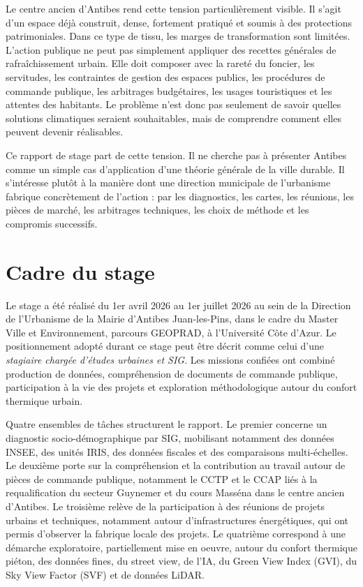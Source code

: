 \documentclass[11pt,a4paper]{report}
\begin{document}
Le centre ancien d'Antibes rend cette tension particulièrement visible. Il s'agit d'un espace déjà construit, dense, fortement pratiqué et soumis à des protections patrimoniales. Dans ce type de tissu, les marges de transformation sont limitées. L'action publique ne peut pas simplement appliquer des recettes générales de rafraîchissement urbain. Elle doit composer avec la rareté du foncier, les servitudes, les contraintes de gestion des espaces publics, les procédures de commande publique, les arbitrages budgétaires, les usages touristiques et les attentes des habitants. Le problème n'est donc pas seulement de savoir quelles solutions climatiques seraient souhaitables, mais de comprendre comment elles peuvent devenir réalisables.

Ce rapport de stage part de cette tension. Il ne cherche pas à présenter Antibes comme un simple cas d'application d'une théorie générale de la ville durable. Il s'intéresse plutôt à la manière dont une direction municipale de l'urbanisme fabrique concrètement de l'action : par les diagnostics, les cartes, les réunions, les pièces de marché, les arbitrages techniques, les choix de méthode et les compromis successifs.

\section*{Cadre du stage}

Le stage a été réalisé du 1er avril 2026 au 1er juillet 2026 au sein de la Direction de l'Urbanisme de la Mairie d'Antibes Juan-les-Pins, dans le cadre du Master Ville et Environnement, parcours GEOPRAD, à l'Université Côte d'Azur. Le positionnement adopté durant ce stage peut être décrit comme celui d'une \emph{stagiaire chargée d'études urbaines et SIG}. Les missions confiées ont combiné production de données, compréhension de documents de commande publique, participation à la vie des projets et exploration méthodologique autour du confort thermique urbain.

Quatre ensembles de tâches structurent le rapport. Le premier concerne un diagnostic socio-démographique par SIG, mobilisant notamment des données INSEE, des unités IRIS, des données fiscales et des comparaisons multi-échelles. Le deuxième porte sur la compréhension et la contribution au travail autour de pièces de commande publique, notamment le CCTP et le CCAP liés à la requalification du secteur Guynemer et du cours Masséna dans le centre ancien d'Antibes. Le troisième relève de la participation à des réunions de projets urbains et techniques, notamment autour d'infrastructures énergétiques, qui ont permis d'observer la fabrique locale des projets. Le quatrième correspond à une démarche exploratoire, partiellement mise en oeuvre, autour du confort thermique piéton, des données fines, du street view, de l'IA, du Green View Index (GVI), du Sky View Factor (SVF) et de données LiDAR.
\end{document}
